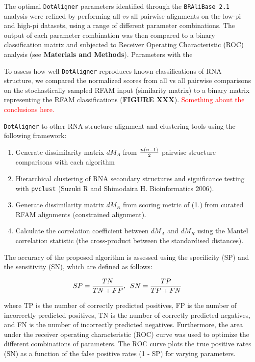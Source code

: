 \documentclass[a4paper,twoside]{article}
\newcommand\dotaligner{\texttt{DotAligner}}
\newcommand\bralibase{\texttt{BRAliBase 2.1}}
\newcommand\pvclust{\texttt{pvclust}}
\newcommand{\RED}[1]{\textcolor{red}{#1}}
\begin{document}
The optimal \dotaligner{} parameters identified through the \bralibase{} analysis were refined by performing all \textit{vs} all pairwise alignments on the low-pi and high-pi datasets, using a range of different parameter combinations. The output of each parameter combination was then compared to a binary classification matrix and subjected to Receiver Operating Characteristic (ROC) analysis (see \textbf{Materials and Methods}). Parameters with the 

To assess how well \dotaligner{} reproduces known classifications of RNA structure,
we compared the normalized scores from all vs all pairwise comparisons on the 
stochastically sampled RFAM input (similarity matrix) to a binary matrix representing
the RFAM classifications (\textbf{FIGURE XXX}). 
\RED{Something about the conclusions here. }


\texttt{DotAligner} to other RNA structure alignment and clustering tools using
the following framework: 

\begin{enumerate}
\item Generate dissimilarity matrix $dM_A$ from ${n(n-1)}\over{2}$ pairwise structure comparisons with each algorithm
\item Hierarchical clustering of RNA secondary structures and significance testing with \pvclust{} (Suzuki R and Shimodaira H. Bioinformatics 2006).
\item Generate dissimilarity matrix $dM_R$ from scoring metric of (1.) from curated RFAM alignments (constrained alignment). 
\item Calculate the correlation coefficient between $dM_A$ and $dM_R$ using the Mantel correlation statistic (the cross-product between the standardised distances). 
\end{enumerate}

\noindent The accuracy of the proposed algorithm is assessed using the
specificity (SP) and the sensitivity (SN), which are defined as follows:

\begin{equation}\label{eq13}
	SP = \frac{TN}{TN + FP}, \hspace{5px} SN = \frac{TP}{TP + FN}
\end{equation}

where TP is the number of correctly predicted positives, FP is the number of
incorrectly predicted positives, TN is the number of correctly predicted
negatives, and FN is the number of incorrectly predicted negatives.
Furthermore, the area under the receiver operating characteristic (ROC) curve
was used to optimize the different combinations of parameters. The ROC curve
plots the true positive rates (SN) as a function of the false positive rates (1
- SP) for varying parameters.
\end{document}
